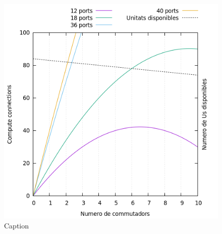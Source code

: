 \begin{figure}[h!]
    \centering
    \includegraphics[width=0.8\linewidth]{img/connections.png}
    \caption{Caption}
    \label{fig:connections}
\end{figure}


